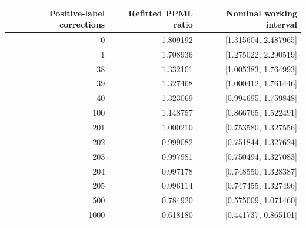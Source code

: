 \begin{tabular}{rrr}
\toprule
Positive-label corrections & Refitted PPML ratio & Nominal working interval \\
\midrule
0 & 1.809192 & [1.315604, 2.487965] \\
1 & 1.708936 & [1.275022, 2.290519] \\
38 & 1.332101 & [1.005383, 1.764993] \\
39 & 1.327468 & [1.000412, 1.761446] \\
40 & 1.323069 & [0.994695, 1.759848] \\
100 & 1.148757 & [0.866765, 1.522491] \\
201 & 1.000210 & [0.753580, 1.327556] \\
202 & 0.999082 & [0.751844, 1.327624] \\
203 & 0.997981 & [0.750494, 1.327083] \\
204 & 0.997178 & [0.748550, 1.328387] \\
205 & 0.996114 & [0.747455, 1.327496] \\
500 & 0.784920 & [0.575009, 1.071460] \\
1000 & 0.618180 & [0.441737, 0.865101] \\
\bottomrule
\end{tabular}
